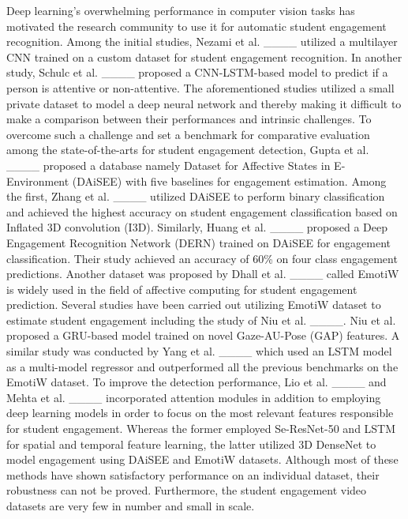 Deep learning's overwhelming performance in computer vision tasks has motivated the research community to use it for automatic student engagement recognition. Among the initial studies, Nezami et al. ____ utilized a multilayer CNN trained on a custom dataset for student engagement recognition. In another study, Schulc et al. ____ proposed a CNN-LSTM-based model to predict if a person is attentive or non-attentive. The aforementioned studies utilized a small private dataset to model a deep neural network and thereby making it difficult to make a comparison between their performances and intrinsic challenges. To overcome such a challenge and set a benchmark for comparative evaluation among the state-of-the-arts for student engagement detection, Gupta et al. ____  proposed a database namely Dataset for Affective States in E-Environment (DAiSEE) with five baselines for engagement estimation. Among the first, Zhang et al. ____ utilized DAiSEE to perform binary classification and achieved the highest accuracy on student engagement classification based on Inflated 3D convolution (I3D). Similarly, Huang et al. ____ proposed a Deep Engagement Recognition Network (DERN) trained on DAiSEE for engagement classification. Their study achieved an accuracy of  60\% on four class engagement predictions. 
Another dataset was proposed by Dhall et al. ____ called EmotiW  is widely used in the field of affective computing for student engagement prediction. Several studies have been carried out utilizing EmotiW dataset to estimate student engagement including the study of Niu et al. ____. Niu et al. proposed a GRU-based model trained on novel Gaze-AU-Pose (GAP) features. A similar study was conducted by Yang et al. ____ which used an LSTM model as a multi-model regressor  and outperformed all the previous benchmarks on the EmotiW dataset. To improve the detection performance,  Lio et al. ____ and Mehta et al. ____ incorporated attention modules in addition to employing deep learning models in order to focus on the most relevant features responsible for student engagement. Whereas the former employed Se-ResNet-50 and LSTM for spatial and temporal feature learning, the latter utilized 3D DenseNet to model engagement using DAiSEE and EmotiW datasets. Although most of these methods have shown satisfactory performance on an individual dataset, their robustness can not be proved. Furthermore, the student engagement video datasets are very few in number and small in scale.

